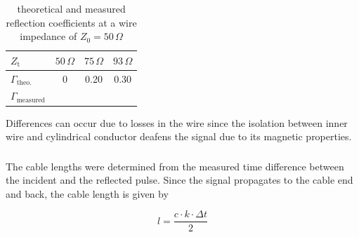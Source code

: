 \documentclass[a4paper,12pt]{article}
\begin{document}
	\begin{table}[h]
		\centering
		\label{tab:reflection}
		\caption{theoretical and measured reflection coefficients at a wire impedance of $Z_0 = 50\,\Omega$}
		\begin{tabular}{l|c|c|c}
			
			$Z_\mathrm{t}$ & $50\,\Omega$ & $75\,\Omega$ & $93\,\Omega$ \\
			\hline
			$\Gamma_\mathrm{theo.}$ & 0 & 0.20 & 0.30 \\

			$\Gamma_\mathrm{measured}$ &  &  &  \\
			
		\end{tabular}

	\end{table}
	
	Differences can occur due to losses in the wire since the isolation between inner wire and cylindrical conductor deafens the signal due to its magnetic properties.

	\subsubsection{}	
	The cable lengths were determined from the measured time difference between the incident and the reflected pulse.
	Since the signal propagates to the cable end and back, the cable length is given by
	
	\[
	l = \frac{c \cdot k \cdot \Delta t}{2}
	\]
	
\end{document}
